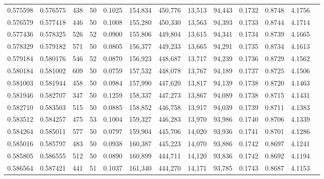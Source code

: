 \begin{tabular}{rrrrrrrrrrrrr}
0.575598 & 0.576575 &   438 &  50 &                                     0.1025 & 154,834 & 450,776 &  13,513 &  94,443 & 0.1732 & 0.8748 & 4.1756 \\
0.576579 & 0.577418 &   446 &  50 &                                     0.1008 & 155,280 & 450,330 &  13,563 &  94,393 & 0.1733 & 0.8744 & 4.1714 \\
0.577436 & 0.578325 &   526 &  52 &                                     0.0900 & 155,806 & 449,804 &  13,615 &  94,341 & 0.1734 & 0.8739 & 4.1665 \\
0.578329 & 0.579182 &   571 &  50 &                                     0.0805 & 156,377 & 449,233 &  13,665 &  94,291 & 0.1735 & 0.8734 & 4.1613 \\
0.579184 & 0.580176 &   546 &  52 &                                     0.0870 & 156,923 & 448,687 &  13,717 &  94,239 & 0.1736 & 0.8729 & 4.1562 \\
0.580184 & 0.581002 &   609 &  50 &                                     0.0759 & 157,532 & 448,078 &  13,767 &  94,189 & 0.1737 & 0.8725 & 4.1506 \\
0.581003 & 0.581944 &   458 &  50 &                                     0.0984 & 157,990 & 447,620 &  13,817 &  94,139 & 0.1738 & 0.8720 & 4.1463 \\
0.581946 & 0.582707 &   347 &  50 &                                     0.1259 & 158,337 & 447,273 &  13,867 &  94,089 & 0.1738 & 0.8715 & 4.1431 \\
0.582710 & 0.583503 &   515 &  50 &                                     0.0885 & 158,852 & 446,758 &  13,917 &  94,039 & 0.1739 & 0.8711 & 4.1383 \\
0.583512 & 0.584257 &   475 &  53 &                                     0.1004 & 159,327 & 446,283 &  13,970 &  93,986 & 0.1740 & 0.8706 & 4.1339 \\
0.584264 & 0.585011 &   577 &  50 &                                     0.0797 & 159,904 & 445,706 &  14,020 &  93,936 & 0.1741 & 0.8701 & 4.1286 \\
0.585016 & 0.585797 &   483 &  50 &                                     0.0938 & 160,387 & 445,223 &  14,070 &  93,886 & 0.1742 & 0.8697 & 4.1241 \\
0.585805 & 0.586555 &   512 &  50 &                                     0.0890 & 160,899 & 444,711 &  14,120 &  93,836 & 0.1742 & 0.8692 & 4.1194 \\
0.586564 & 0.587421 &   441 &  51 &                                     0.1037 & 161,340 & 444,270 &  14,171 &  93,785 & 0.1743 & 0.8687 & 4.1153 \\

\end{tabular}
